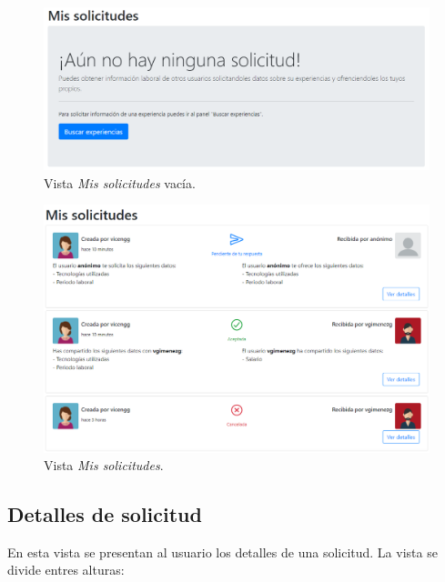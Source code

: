 \documentclass[a4paper, 12pt]{book}
\begin{document}
    \begin{figure}
        \centering
        \includegraphics[width=15cm, keepaspectratio]{img/my_negotiations_empty.PNG}
        \caption{Vista \emph{Mis solicitudes} vacía.}\label{fig:view_my_negotiations_empty}
    \end{figure}

    \begin{figure}
        \centering
        \includegraphics[width=15cm, keepaspectratio]{img/my_negotiations.PNG}
        \caption{Vista \emph{Mis solicitudes}.}\label{fig:view_my_negotiations}
    \end{figure}

    \subsection{Detalles de solicitud}
    \label{subsec:view_negotiation_details}
    En esta vista se presentan al usuario los detalles de una solicitud.
    La vista se divide entres alturas:
\end{document}

